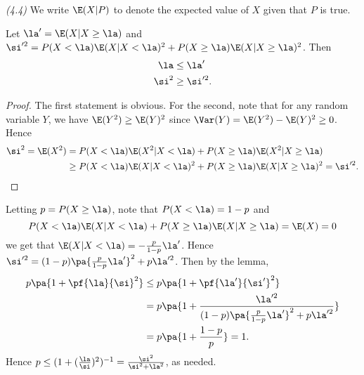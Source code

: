 \begin{problem}{\it (4.4)}
We write $\E(X|P)$ to denote the expected value of $X$ given that $P$ is true. 
\begin{lem}
Let $\la'=\E(X|X\ge \la)$ and $\si'^2=P(X<\la)\E(X|X<\la)^2+P(X\ge \la)\E(X|X\ge \la)^2$. Then
\begin{align*}
\la&\le \la'\\
\si^2&\ge \si'^2.
\end{align*}
\end{lem}
\begin{proof}
The first statement is obvious. For the second, note that for any random variable $Y$, we have $\E(Y^2)\ge \E(Y)^2$ since $\Var(Y)=\E(Y^2)-\E(Y)^2\ge 0$. Hence
\begin{align*}
\si^2=\E(X^2)&= P(X<\la)\E(X^2|X<\la)+P(X\ge \la)\E(X^2|X\ge \la)\\
&\ge P(X<\la)\E(X|X<\la)^2+P(X\ge \la)\E(X|X\ge \la)^2=\si'^2.
\end{align*}
\end{proof}
Letting $p=P(X\ge \la)$, note that $P(X<\la)=1-p$ and
\[
P(X<\la)\E(X|X<\la)+P(X\ge \la)\E(X|X\ge \la)=\E(X)=0
\]
we get that $\E(X|X<\la)=-\frac{p}{1-p}\la'$. Hence $\si'^2=(1-p)\pa{\frac p{1-p}\la'}^2+p\la'^2$. Then by the lemma,
\begin{align*}
p\pa{1+\pf{\la}{\si}^2}&
\le p\pa{1+\pf{\la'}{\si'}^2}\\
&=p\pa{1+\frac{\la'^2}{(1-p)\pa{\frac p{1-p}\la'}^2+p\la'^2}}\\
&=p\pa{1+\frac{1-p}{p}}=1.
\end{align*}
Hence $p\le (1+(\frac{\la}{\si})^2)^{-1} =\frac{\si^2}{\si^2+\la^2}$, as needed.
\end{problem}
